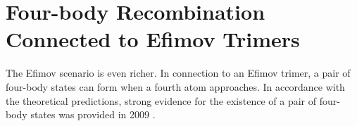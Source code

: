 \section{Four-body Recombination Connected to Efimov Trimers} 
The Efimov scenario is even richer. In connection to an Efimov trimer, a pair of four-body states can form when a fourth atom approaches. In accordance with the theoretical predictions, strong evidence for the existence of a pair of four-body states was provided in 2009 \cite{Grimm:2009}.